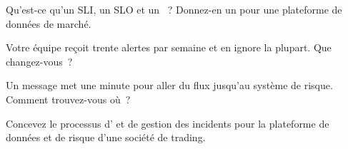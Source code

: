 \begin{interviewq}\label{iq:pl:observability-and-incident-response:2}
Qu'est-ce qu'un SLI, un SLO et un ~? Donnez-en un pour une plateforme de données de marché.
\end{interviewq}

\begin{interviewq}\label{iq:pl:observability-and-incident-response:3}
Votre équipe reçoit trente alertes par semaine et en ignore la plupart. Que changez-vous~?
\end{interviewq}

\begin{interviewq}\label{iq:pl:observability-and-incident-response:4}
Un message met une minute pour aller du flux jusqu'au système de risque. Comment trouvez-vous où~?
\end{interviewq}

\begin{interviewq}\label{iq:pl:observability-and-incident-response:5}
Concevez le processus d' et de gestion des incidents pour la plateforme de données et de risque d'une société de trading.
\end{interviewq}
